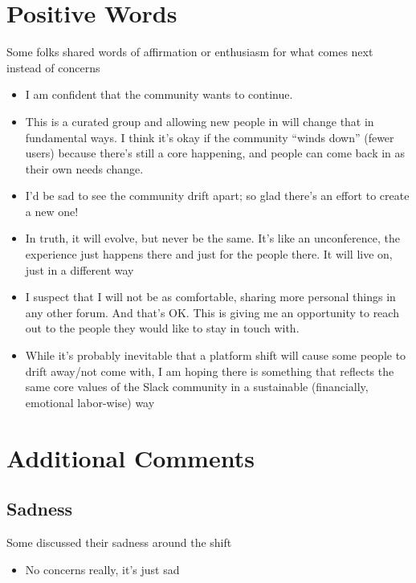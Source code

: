 \documentclass[
]{book}
\providecommand{\tightlist}{%
  \setlength{\itemsep}{0pt}\setlength{\parskip}{0pt}}
\begin{document}
\section{Positive Words}\label{positive-words}

Some folks shared words of affirmation or enthusiasm for what comes next instead of concerns

\begin{itemize}
\tightlist
\item
  I am confident that the community wants to continue.
\item
  This is a curated group and allowing new people in will change that in fundamental ways. I think it's okay if the community ``winds down'' (fewer users) because there's still a core happening, and people can come back in as their own needs change.
\item
  I'd be sad to see the community drift apart; so glad there's an effort to create a new one!
\item
  In truth, it will evolve, but never be the same. It's like an unconference, the experience just happens there and just for the people there. It will live on, just in a different way
\item
  I suspect that I will not be as comfortable, sharing more personal things in any other forum. And that's OK. This is giving me an opportunity to reach out to the people they would like to stay in touch with.
\item
  While it's probably inevitable that a platform shift will cause some people to drift away/not come with, I am hoping there is something that reflects the same core values of the Slack community in a sustainable (financially, emotional labor-wise) way
\end{itemize}

\section{Additional Comments}\label{additional-comments}

\subsection{Sadness}\label{sadness}

Some discussed their sadness around the shift

\begin{itemize}
\tightlist
\item
  No concerns really, it's just sad
\end{itemize}
\end{document}
